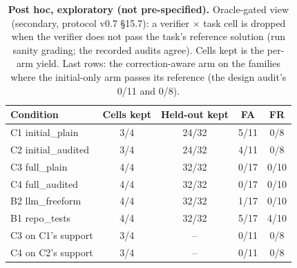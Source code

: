 \begin{table}[t]\centering\footnotesize
\caption{\textbf{Post hoc, exploratory (not pre-specified).} Oracle-gated view (secondary, protocol v0.7 \S15.7): a verifier $\times$ task cell is dropped when the verifier does not pass the task's reference solution (run sanity grading; the recorded audits agree). Cells kept is the per-arm yield. Last rows: the correction-aware arm on the families where the initial-only arm passes its reference (the design audit's 0/11 and 0/8).}\label{tab:expl-gated}
\begin{tabular}{lcccc}\toprule Condition & Cells kept & Held-out kept & FA & FR \\\midrule
C1 initial\_plain & 3/4 & 24/32 & 5/11 & 0/8 \\
C2 initial\_audited & 3/4 & 24/32 & 4/11 & 0/8 \\
C3 full\_plain & 4/4 & 32/32 & 0/17 & 0/10 \\
C4 full\_audited & 4/4 & 32/32 & 0/17 & 0/10 \\
B2 llm\_freeform & 4/4 & 32/32 & 1/17 & 0/10 \\
B1 repo\_tests & 4/4 & 32/32 & 5/17 & 4/10 \\
C3 on C1's support & 3/4 & -- & 0/11 & 0/8 \\
C4 on C2's support & 3/4 & -- & 0/11 & 0/8 \\
\bottomrule\end{tabular}\end{table}
